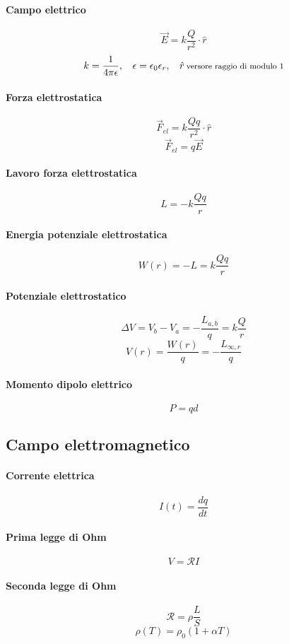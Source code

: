 \documentclass[12pt]{article}
\begin{document}
    \paragraph*{Campo elettrico}
    \[\vec{E} = k \frac{Q}{r^2} \cdot \hat{r}\]
    \[k = \frac{1}{4\pi\epsilon}, \:\:\:\: \epsilon = \epsilon_0\epsilon_r, \:\:\:\: \hat{r} \:\text{\footnotesize{versore raggio di modulo 1}}\]
    \paragraph*{Forza elettrostatica}
    \[\vec{F}_{el} = k \frac{Q q}{r^2} \cdot \hat{r}\]
    \[\vec{F}_{el} = q\vec{E}\]
    \paragraph*{Lavoro forza elettrostatica}
    \[L = -k \frac{Q q}{r} \]
    \paragraph*{Energia potenziale elettrostatica}
    \[W(r) =-L= k \frac{Q q}{r} \]
    \paragraph*{Potenziale elettrostatico}
    \[\Delta V = V_b - V_a = -\frac{L_{a,b}}{q} = k\frac{Q}{r}\]
    \[V(r) = \frac{W(r)}{q} = - \frac{L_{\infty, r}}{q}\]
    \paragraph*{Momento dipolo elettrico}
    \[P = qd\]
    \newline
    \subsection{Campo elettromagnetico}
    \paragraph*{Corrente elettrica}
    \[I(t) = \frac{dq}{dt}\]
    \paragraph*{Prima legge di Ohm}
    \[V = \mathcal{R}I\]
    \paragraph*{Seconda legge di Ohm}
    \[\mathcal{R} = \rho\frac{L}{S}\]
    \[\rho(T) = \rho_0(1+\alpha T)\]
\end{document}
